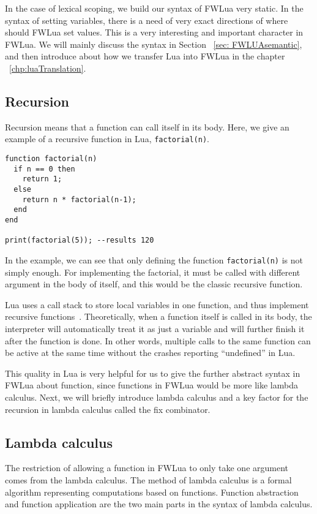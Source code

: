 In the case of lexical scoping, we build our syntax of FWLua very static. In the syntax of setting variables, there is a need of very exact directions of where should FWLua set values. This is a very interesting and important character in FWLua. We will mainly discuss the syntax in Section ~\ref{sec: FWLUAsemantic}, and then introduce about how we transfer Lua into FWLua in the chapter ~\ref{chp:luaTranslation}.


\subsection{Recursion}\label{sec:recursions}

Recursion means that a function can call itself in its body.
Here, we give an example of a recursive function in Lua, {\tt factorial(n)}.

\begin{verbatim}
function factorial(n)
  if n == 0 then
    return 1;
  else
    return n * factorial(n-1);
  end
end

print(factorial(5)); --results 120
\end{verbatim}

In the example, we can see that only defining the function {\tt factorial(n)} is not simply enough. For implementing the factorial, it must be called with different argument in the body of itself, and this would be the classic recursive function.

Lua uses a call stack to store local variables in one function, and thus implement recursive functions~\cite{begLua}. Theoretically, when a function itself is called in its body, the interpreter will automatically treat it as just a variable and will further finish it after the function is done. In other words, multiple calls to the same function can be active at the same time without the crashes reporting ``undefined'' in Lua.

This quality in Lua is very helpful for us to give the further abstract syntax in FWLua about function, since functions in FWLua would be more like lambda calculus. Next, we will briefly introduce lambda calculus and a key factor for the recursion in lambda calculus called the fix combinator.

\subsection{Lambda calculus}
The restriction of allowing a function in FWLua to only take one argument comes from the lambda calculus. The method of lambda calculus is a formal algorithm representing computations based on functions. Function abstraction and function application are the two main parts in the syntax of lambda calculus. 

